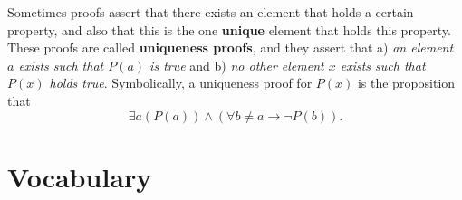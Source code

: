 \documentclass[12pt,letterpaper]{article}
\begin{document}
Sometimes proofs assert that there exists an element that holds a certain property, and also that this is the one \textbf{unique} element that holds this property. These proofs are called \textbf{uniqueness proofs}, and they assert that a) \textit{an element $a$ exists such that $P(a)$ is true} and b) \textit{no other element $x$ exists such that $P(x)$ holds true}. Symbolically, a uniqueness proof for $P(x)$ is the proposition that $$\exists a \left(P(a)\right) \wedge \left(\forall b \neq a \rightarrow \lnot P(b)\right).$$





\pagebreak

\section{Vocabulary}
	
\end{document}
